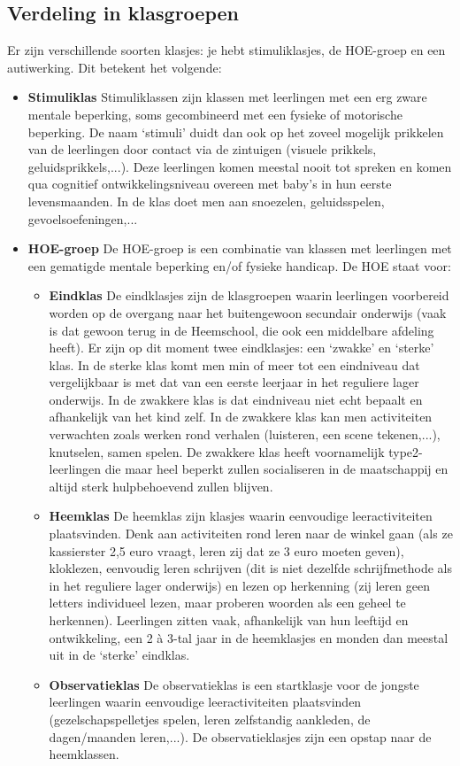 \documentclass[a4paper,11pt]{article}
\theoremstyle{definition}
\begin{document}
\subsection{Verdeling in klasgroepen}\label{klasgroepen}
\noindent Er zijn verschillende soorten klasjes: je hebt stimuliklasjes, de 
HOE-groep en een autiwerking. Dit betekent het volgende:
\begin{itemize}
  \item \textbf{Stimuliklas} Stimuliklassen zijn klassen met leerlingen met een erg 
  zware mentale beperking, soms gecombineerd met een fysieke of motorische beperking. De naam `stimuli' duidt dan ook op het zoveel mogelijk prikkelen van de leerlingen
  door contact via de zintuigen (visuele prikkels, geluidsprikkels,...). Deze leerlingen komen meestal nooit tot spreken 
  en komen qua cognitief ontwikkelingsniveau overeen met baby's in hun eerste 
  levensmaanden. In de klas doet men aan snoezelen, geluidsspelen, 
  gevoelsoefeningen,...
  \item \textbf{HOE-groep}
  De HOE-groep is een combinatie van klassen met leerlingen met een gematigde 
  mentale beperking en/of fysieke handicap. De HOE staat voor:
  \begin{itemize}
    \item \textbf{Eindklas} De eindklasjes zijn de klasgroepen waarin leerlingen 
    voorbereid worden op de overgang naar het buitengewoon secundair onderwijs (vaak is dat gewoon terug in de Heemschool, die ook een middelbare
    afdeling heeft). Er zijn op dit moment twee eindklasjes: een `zwakke' en 
    `sterke' klas. In de sterke klas komt men min of meer tot een eindniveau dat 
    vergelijkbaar is met dat van een eerste leerjaar in het reguliere lager 
    onderwijs. In de zwakkere klas is dat eindniveau niet echt bepaalt en 
    afhankelijk van het kind zelf. In de zwakkere klas kan men activiteiten 
    verwachten zoals werken rond verhalen (luisteren, een scene tekenen,...), 
    knutselen, samen spelen. De zwakkere klas heeft voornamelijk type2-leerlingen die maar heel 
    beperkt zullen socialiseren in de maatschappij en altijd sterk hulpbehoevend 
    zullen blijven. 
    \item \textbf{Heemklas} De heemklas zijn klasjes waarin eenvoudige leeractiviteiten 
    plaatsvinden. Denk aan activiteiten rond leren naar de winkel gaan (als ze kassierster 2,5 euro vraagt, leren zij dat
    ze 3 euro moeten geven), kloklezen, eenvoudig leren schrijven (dit is niet dezelfde schrijfmethode als in het reguliere lager onderwijs) 
    en lezen op herkenning (zij leren geen letters individueel lezen, maar proberen woorden als een geheel te 
    herkennen). Leerlingen zitten vaak, afhankelijk van hun leeftijd en ontwikkeling, een 2 à 3-tal 
    jaar in de heemklasjes en monden dan meestal uit in de `sterke' eindklas. 
   \item  \textbf{Observatieklas}  De observatieklas is een startklasje voor de jongste 
   leerlingen waarin eenvoudige leeractiviteiten plaatsvinden (gezelschapspelletjes spelen, leren zelfstandig aankleden, de dagen/maanden 
   leren,...). De observatieklasjes zijn een opstap naar de heemklassen.
   

\end{itemize}
\end{itemize}
\end{document}

